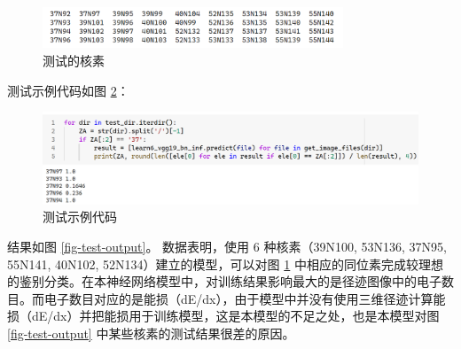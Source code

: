 \documentclass[AutoFakeBold]{LZUThesis}
\begin{document}
\begin{figure}[H]
    \centering
    \includegraphics[width=0.8\textwidth]{figures/other-nuclides.png}
    \caption{测试的核素}
    \label{fig-other-nuclides}
\end{figure}

测试示例代码如图 \ref{fig-test-code}：

\begin{figure}[H]
    \centering
    \includegraphics[width=1.0\textwidth]{figures/test-code.png}
    \caption{测试示例代码}
    \label{fig-test-code}
\end{figure}


结果如图 \ref{fig-test-output}。
数据表明，使用 6 种核素（39N100, 53N136, 37N95, 55N141, 40N102, 52N134）建立的模型，可以对图 \ref{fig-other-nuclides} 中相应的同位素完成较理想的鉴别分类。在本神经网络模型中，对训练结果影响最大的是径迹图像中的电子数目。而电子数目对应的是能损（dE/dx），由于模型中并没有使用三维径迹计算能损（dE/dx）并把能损用于训练模型，这是本模型的不足之处，也是本模型对图 \ref{fig-test-output} 中某些核素的测试结果很差的原因。
\end{document}
